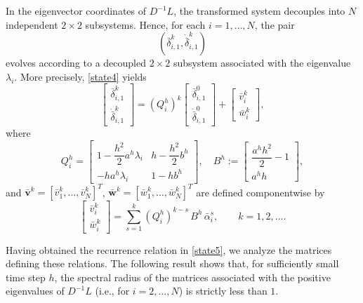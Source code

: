 \documentclass[letterpaper,journal]{IEEEtran}
\begin{document}
In the eigenvector coordinates of \(D^{-1}L\), the transformed system decouples into \(N\) independent \(2\times2\) subsystems. Hence, for each \(i=1,\dots,N\), the pair
\[
(\bar{\delta}_{i,1}^k,\dot{\bar{\delta}}_{i,1}^k)
\]
evolves according to a decoupled \(2\times 2\) subsystem associated with the eigenvalue \(\lambda_i\). More precisely, \eqref{state4} yields
\begin{equation}\label{state5}
\begin{bmatrix}
\bar{\delta}_{i,1}^k \\[5pt]
\dot{\bar{\delta}}_{i,1}^k
\end{bmatrix}
=
(Q^{h}_{i})^k
\begin{bmatrix}
\bar{\delta}_{i,1}^{0} \\[5pt]
\dot{\bar{\delta}}_{i,1}^{0}
\end{bmatrix}
+
\begin{bmatrix}
\bar{v}_i^k \\[5pt]
\bar{w}_i^k
\end{bmatrix},
\end{equation}
where
\[
Q^{h}_{i}=
\begin{bmatrix}
1-\dfrac{h^2}{2}a^h\lambda_{i} & h-\dfrac{h^2}{2} b^h \\[6pt]
- h a^h\lambda_{i} & 1- h b^h
\end{bmatrix},
\quad
B^h :=
\begin{bmatrix}
\dfrac{a^h h^2}{2}-1 \\[6pt]
a^h h
\end{bmatrix},
\]
and \(\bar{\bm{v}}^{k}=[\bar{v}_{1}^{k},\dots,\bar{v}_{N}^{k}]^T\),
\(\bar{\bm{w}}^{k}=[\bar{w}_{1}^{k},\dots,\bar{w}_{N}^{k}]^T\) are defined componentwise by
\begin{equation}\label{vk_def}
\begin{bmatrix}
\bar{v}_i^k \\[5pt]
\bar{w}_i^k
\end{bmatrix}
=
\sum_{s=1}^{k}
(Q_i^h)^{k-s}\, B^h\, \bar{\alpha}_i^{s},
\qquad k=1,2,\dots .
\end{equation}

Having obtained the recurrence relation in \eqref{state5}, we analyze the matrices defining these relations. The following result shows that, for sufficiently small time step $h$, the spectral radius of the matrices associated with the positive eigenvalues of \(D^{-1}L\) (i.e., for $i = 2, \dots, N$) is strictly less than $1$.
\end{document}
